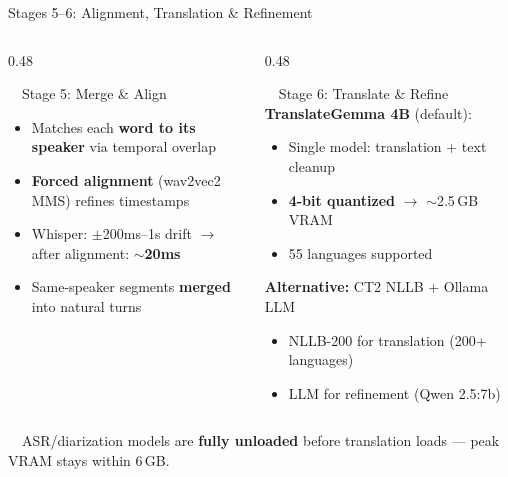 \documentclass[aspectratio=169, 11pt]{beamer}
\begin{document}
\begin{frame}{Stages 5--6: Alignment, Translation \& Refinement}
    \begin{columns}[T]
        \begin{column}{0.48\textwidth}
            \begin{block}{\faCrosshairs\ \ Stage 5: Merge \& Align}
                \scriptsize
                \begin{itemize}
                    \item Matches each \textbf{word to its speaker} via temporal overlap
                    \item \textbf{Forced alignment} (wav2vec2 MMS) refines timestamps
                    \item Whisper: $\pm$200ms--1s drift $\rightarrow$ after alignment: \textbf{$\sim$20ms}
                    \item Same-speaker segments \textbf{merged} into natural turns
                \end{itemize}
            \end{block}
        \end{column}
        \begin{column}{0.48\textwidth}
            \begin{block}{\faLanguage\ \ Stage 6: Translate \& Refine}
                \scriptsize
                \textbf{TranslateGemma 4B} (default):
                \begin{itemize}
                    \item Single model: translation + text cleanup
                    \item \textbf{4-bit quantized} $\rightarrow$ $\sim$2.5\,GB VRAM
                    \item 55 languages supported
                \end{itemize}
                \vspace{0.2em}
                \textbf{Alternative:} CT2 NLLB + Ollama LLM
                \begin{itemize}
                    \item NLLB-200 for translation (200+ languages)
                    \item LLM for refinement (Qwen 2.5:7b)
                \end{itemize}
            \end{block}
        \end{column}
    \end{columns}
    \vspace{0.2em}
    \centering
    \colorbox{pipeblue!10}{\parbox{0.85\textwidth}{\centering
        \scriptsize\faMemory\ \ ASR/diarization models are \textbf{fully unloaded} before translation loads --- peak VRAM stays within 6\,GB.
    }}
\end{frame}
\end{document}
